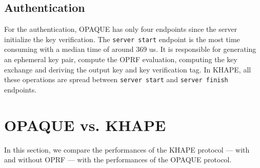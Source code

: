 ﻿\documentclass[../report.tex]{subfiles}
\begin{document}
\subsection*{Authentication}
For the authentication, OPAQUE has only four endpoints since the server initialize the key verification. The \verb|server start| endpoint is the most time consuming with a median time of around 369 us. It is responsible for generating an ephemeral key pair, compute the OPRF evaluation, computing the key exchange and deriving the output key and key verification tag. In KHAPE, all these operations are spread between \verb|server start| and \verb|server finish| endpoints.

\section{OPAQUE vs. KHAPE} %
In this section, we compare the performances of the KHAPE protocol --- with and without OPRF --- with the performances of the OPAQUE protocol.

\pgfplotsset{width=\textwidth-2.4cm}
\end{document}

